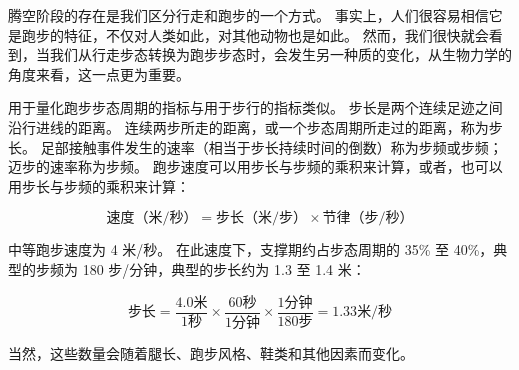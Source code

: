 腾空阶段的存在是我们区分行走和跑步的一个方式。
事实上，人们很容易相信它是跑步的特征，不仅对人类如此，对其他动物也是如此。
然而，我们很快就会看到，当我们从行走步态转换为跑步步态时，会发生另一种质的变化，从生物力学的角度来看，这一点更为重要。


用于量化跑步步态周期的指标与用于步行的指标类似。
步长是两个连续足迹之间沿行进线的距离。
连续两步所走的距离，或一个步态周期所走过的距离，称为步长。
足部接触事件发生的速率（相当于步长持续时间的倒数）称为步频或步频；迈步的速率称为步频。
跑步速度可以用步长与步频的乘积来计算，或者，也可以用步长与步频的乘积来计算：

\begin{equation}
	\text{速度（米/秒）} = \text{步长（米/步）} \times \text{节律（步/秒）} \label{eq:3_1}
\end{equation}

中等跑步速度为 4 米/秒。
在此速度下，支撑期约占步态周期的 35\% 至 40\%，典型的步频为 180 步/分钟，典型的步长约为 1.3 至 1.4 米：

\begin{equation}
	\text{步长} = \frac{4.0 \text{米}}{1 \text{秒}}
				 \times \frac{60 \text{秒}}{1 \text{分钟}}
				 \times \frac{1 \text{分钟}}{180 \text{步}}
				 = 1.33 \text{米/秒}
				 \label{eq:3_2}
\end{equation}

当然，这些数量会随着腿长、跑步风格、鞋类和其他因素而变化。












